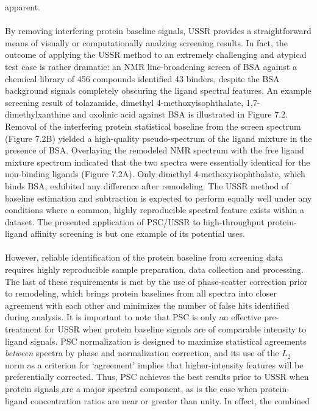 \begin{doublespace}
apparent.
\\\\
By removing interfering protein baseline signals, USSR provides a
straightforward means of visually or computationally analzing screening
results. In fact, the outcome of applying the USSR method to an extremely
challenging and atypical test case is rather dramatic: an NMR line-broadening
screen of BSA against a chemical library of 456 compounds identified 43
binders, despite the BSA background signals completely obscuring the ligand
spectral features. An example screening result of tolazamide, dimethyl
4-methoxyisophthalate, 1,7-dimethylxanthine and oxolinic acid against BSA is
illustrated in Figure 7.2. Removal of the interfering protein statistical
baseline from the screen spectrum (Figure 7.2B) yielded a high-quality
pseudo-spectrum of the ligand mixture in the presence of BSA. Overlaying the
remodeled NMR spectrum with the free ligand mixture spectrum indicated that
the two spectra were essentially identical for the non-binding ligands
(Figure 7.2A). Only dimethyl 4-methoxyisophthalate, which binds BSA, exhibited
any difference after remodeling. The USSR method of baseline estimation and
subtraction is expected to perform equally well under any conditions where a
common, highly reproducible spectral feature exists within a dataset. The
presented application of PSC/USSR to high-throughput protein-ligand affinity
screening is but one example of its potential uses.
\\\\
However, reliable identification of the protein baseline from screening data
requires highly reproducible sample preparation, data collection and
processing. The last of these requirements is met by the use of phase-scatter
correction prior to remodeling, which brings protein baselines from all spectra
into closer agreement with each other and minimizes the number of false hits
identified during analysis. It is important to note that PSC is only an
effective pre-treatment for USSR when protein baseline signals are of
comparable intensity to ligand signals. PSC normalization is designed to
maximize statistical agreements \emph{between} spectra by phase and
normalization correction, and its use of the $L_2$ norm as a criterion for
`agreement' implies that higher-intensity features will be preferentially
corrected. Thus, PSC achieves the best results prior to USSR when protein
signals are a major spectral component, as is the case when protein-ligand
concentration ratios are near or greater than unity. In effect, the combined

\end{doublespace}
